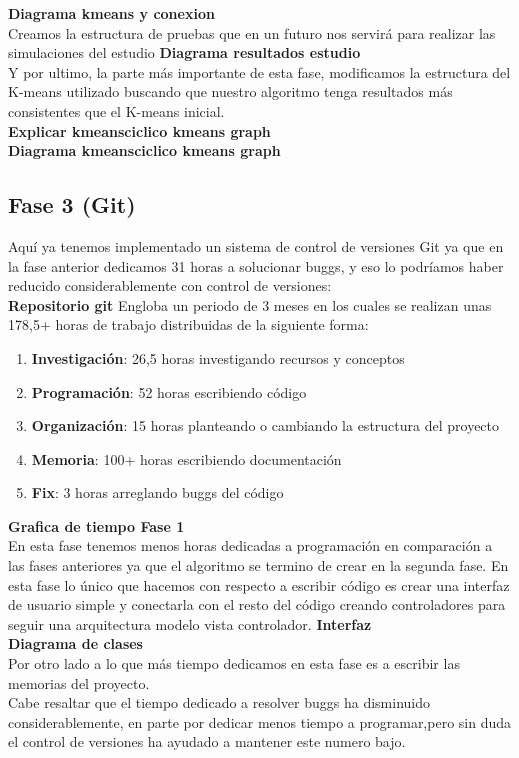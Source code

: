 \documentclass[12pt,a4paper]{article}
\begin{document}
	\textbf{Diagrama kmeans y conexion}\\
	Creamos la estructura de pruebas que en un futuro nos servirá para realizar las simulaciones del estudio
	\textbf{Diagrama resultados estudio}\\
	Y por ultimo, la parte más importante de esta fase, modificamos la estructura del K-means utilizado buscando que nuestro algoritmo tenga resultados más consistentes que el K-means inicial.\\
	\textbf{Explicar kmeansciclico kmeans graph}\\
	\textbf{Diagrama kmeansciclico kmeans graph}\\
	\subsection{Fase 3 (Git)}
Aquí ya tenemos implementado un sistema de control de versiones Git ya que en la fase anterior dedicamos 31 horas a solucionar buggs, y eso lo podríamos haber reducido considerablemente con control de versiones:\\
	\textbf{Repositorio git}
	Engloba un periodo de 3 meses en los cuales se realizan unas 178,5+ horas de trabajo distribuidas de la siguiente forma:\\
	\begin{enumerate}
	\item \textbf{Investigación}: 26,5 horas investigando recursos y conceptos
	\item \textbf{Programación}: 52 horas escribiendo código
	\item \textbf{Organización}: 15 horas planteando o cambiando la estructura del proyecto
	\item \textbf{Memoria}: 100+ horas escribiendo documentación
	\item \textbf{Fix}: 3 horas arreglando buggs del código
	\end{enumerate}
	\textbf{Grafica de tiempo Fase 1}\\
	En esta fase tenemos menos horas dedicadas a programación en comparación a las fases anteriores ya que el algoritmo se termino de crear en la segunda fase. En esta fase lo único que hacemos con respecto a escribir código es crear una interfaz de usuario simple y conectarla con el resto del código creando controladores para seguir una arquitectura modelo vista controlador.
	\textbf{Interfaz}\\
	\textbf{Diagrama de clases}\\
	Por otro lado a lo que más tiempo dedicamos en esta fase es a escribir las memorias del proyecto.\\
	Cabe resaltar que el tiempo dedicado a resolver buggs ha disminuido considerablemente, en parte por dedicar menos tiempo a programar,pero sin duda el control de versiones ha ayudado a mantener este numero bajo.\\
\end{document}
